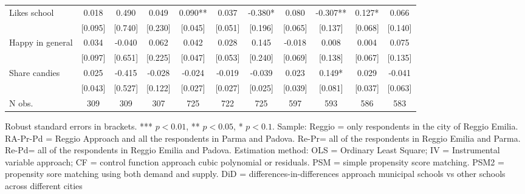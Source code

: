 \documentclass[12pt]{article}
\begin{document}
\begin{table}[ht]
\begin{center}
\begin{adjustbox}{width=1.2\textwidth,center=\textwidth}
\begin{tabular}{l*{10}{c}}
Likes school & 0.018 & 0.490 & 0.049 & 0.090** & 0.037 & -0.380* & 0.080 & -0.307** & 0.127* & 0.066 \\
 & [0.095] & [0.740] & [0.230] & [0.045] & [0.051] & [0.196] & [0.065] & [0.137] & [0.068] & [0.140] \\
Happy in general & 0.034 & -0.040 & 0.062 & 0.042 & 0.028 & 0.145 & -0.018 & 0.008 & 0.004 & 0.075 \\
 & [0.097] & [0.651] & [0.225] & [0.047] & [0.053] & [0.240] & [0.069] & [0.138] & [0.067] & [0.135] \\
Share candies & 0.025 & -0.415 & -0.028 & -0.024 & -0.019 & -0.039 & 0.023 & 0.149* & 0.029 & -0.041 \\
 & [0.043] & [0.527] & [0.122] & [0.027] & [0.027] & [0.025] & [0.039] & [0.081] & [0.037] & [0.063] \\

\hline
N obs. &  309 & 309 & 307 & 725 & 722 & 725 & 597 & 593 & 586 & 583 \\

\hline
\end{tabular}
\end{adjustbox}
\end{center}

\begin{footnotesize}
\raggedright{Robust standard errors in brackets. *** $p<0.01$, ** $p<0.05$, * $p<0.1$. Sample: Reggio = only respondents in the city of Reggio Emilia. RA-Pr-Pd = Reggio Approach and all the respondents in Parma and Padova. Re-Pr= all of the respondents in Reggio Emilia and Parma. Re-Pd= all of the respondents in Reggio Emilia and Padova. Estimation method: OLS = Ordinary Least Square; IV = Instrumental variable approach; CF = control function approach cubic polynomial or residuals. PSM = simple propensity score matching. PSM2 = propensity sore matching using both demand and supply. DiD = differences-in-differences approach municipal schools vs other schools across different cities}
\end{footnotesize}
\end{table}
\end{document}
